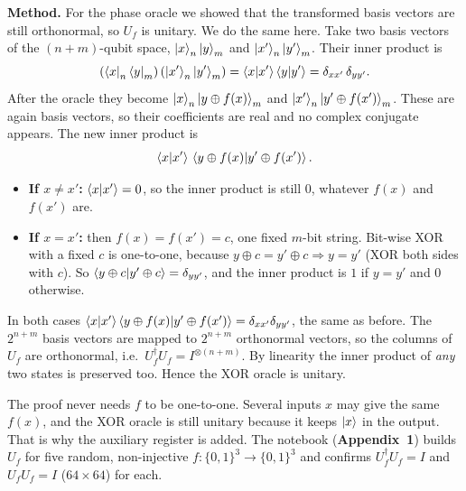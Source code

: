 \documentclass[a4paper, 10pt]{article}
\begin{document}
\begin{solution}
	\noindent \textbf{Method.} For the phase oracle we showed that the transformed basis vectors are still orthonormal, so \( U_f \) is unitary. We do the same here.
	Take two basis vectors of the \( (n + m) \)-qubit space, \( \ket{x}_n\ket{y}_m \) and \( \ket{x'}_n\ket{y'}_m \). Their inner product is
	\[
		\left(\bra{x}_n\bra{y}_m\right)\left(\ket{x'}_n\ket{y'}_m\right) = \braket{x \vert x'}\braket{y \vert y'} = \delta_{xx'}\,\delta_{yy'} .
	\]
	After the oracle they become \( \ket{x}_n\ket{y \oplus f(x)}_m \) and \( \ket{x'}_n\ket{y' \oplus f(x')}_m \). These are again basis vectors, so their coefficients are real and no complex conjugate appears. The new inner product is
	\[
		\braket{x \vert x'}\,\braket{y \oplus f(x) \vert y' \oplus f(x')} .
	\]
	\begin{itemize}
		\item \textbf{If \( x \neq x' \):} \( \braket{x \vert x'} = 0 \), so the inner product is still \( 0 \), whatever \( f(x) \) and \( f(x') \) are.
		\item \textbf{If \( x = x' \):} then \( f(x) = f(x') = c \), one fixed \( m \)-bit string. Bit-wise XOR with a fixed \( c \) is one-to-one, because \( y \oplus c = y' \oplus c \Rightarrow y = y' \) (XOR both sides with \( c \)).
		      So \( \braket{y \oplus c \vert y' \oplus c} = \delta_{yy'} \), and the inner product is \( 1 \) if \( y = y' \) and \( 0 \) otherwise.
	\end{itemize}
	In both cases \( \braket{x \vert x'}\braket{y \oplus f(x) \vert y' \oplus f(x')} = \delta_{xx'}\delta_{yy'} \), the same as before. The \( 2^{n + m} \) basis vectors are mapped to \( 2^{n + m} \) orthonormal vectors, so the columns of \( U_f \) are orthonormal, i.e.\ \( U_f^{\dagger}U_f = I^{\otimes(n + m)} \). By linearity the inner product of \emph{any} two states is preserved too. Hence the XOR oracle is unitary.

	\begin{remark}
		The proof never needs \( f \) to be one-to-one. Several inputs \( x \) may give the same \( f(x) \), and the XOR oracle is still unitary because it keeps \( \ket{x} \) in the output.
		That is why the auxiliary register is added. The notebook (\textbf{Appendix~1}) builds \( U_f \) for five random, non-injective \( f : \{0, 1\}^3 \to \{0, 1\}^3 \) and confirms \( U_f^{\dagger}U_f = I \) and \( U_fU_f = I \) (\( 64 \times 64 \)) for each.
	\end{remark}
\end{solution}
\end{document}
